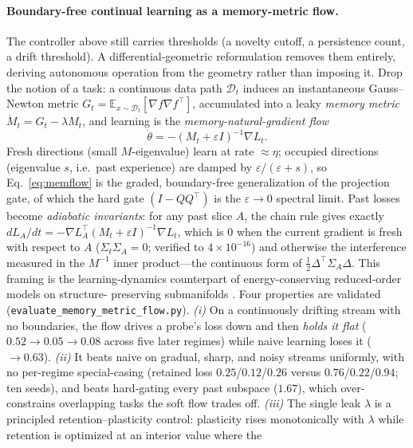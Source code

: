 \documentclass[10pt,a4paper]{article}
\theoremstyle{plain}
\theoremstyle{definition}
\newcommand{\Sig}{\Sigma}
\newcommand{\Del}{\Delta}
\begin{document}
\paragraph{Boundary-free continual learning as a memory-metric flow.} The controller
above still carries thresholds (a novelty cutoff, a persistence count, a drift
threshold). A differential-geometric reformulation removes them entirely, deriving
autonomous operation from the geometry rather than imposing it. Drop the notion of a task:
a continuous data path $\mathcal D_t$ induces an instantaneous Gauss--Newton metric
$G_t=\mathbb{E}_{x\sim\mathcal D_t}[\nabla f\nabla f^\top]$, accumulated into a leaky
\emph{memory metric} $\dot M_t=G_t-\lambda M_t$, and learning is the
\emph{memory-natural-gradient flow}
\begin{equation}
\dot\theta=-(M_t+\varepsilon I)^{-1}\nabla L_t.
\label{eq:memflow}
\end{equation}
Fresh directions (small $M$-eigenvalue) learn at rate $\approx\!\eta$; occupied
directions (eigenvalue $s$, i.e.\ past experience) are damped by $\varepsilon/(\varepsilon+s)$,
so Eq.~\eqref{eq:memflow} is the graded, boundary-free generalization of the projection
gate, of which the hard gate $(I-QQ^\top)$ is the $\varepsilon\!\to\!0$ spectral limit. Past
losses become \emph{adiabatic invariants}: for any past slice $A$, the chain rule gives
exactly $dL_A/dt=-\nabla L_A^\top(M_t+\varepsilon I)^{-1}\nabla L_t$, which is $0$ when the
current gradient is fresh with respect to $A$ ($\Sig_t\Sig_A=0$; verified to $4\times
10^{-16}$) and otherwise the interference measured in the $M^{-1}$ inner
product---the continuous form of $\tfrac12\Del^\top\Sig_A\Del$. This framing is the
learning-dynamics counterpart of energy-conserving reduced-order models on structure-
preserving submanifolds \cite{friedl2026hamiltonian}. Four properties are validated
(\texttt{evaluate\_memory\_metric\_flow.py}). \emph{(i)} On a continuously drifting stream
with no boundaries, the flow drives a probe's loss down and then \emph{holds it flat}
($0.52\!\to\!0.05\!\to\!0.08$ across five later regimes) while naive learning loses it
($\to0.63$). \emph{(ii)} It beats naive on gradual, sharp, and noisy streams uniformly,
with no per-regime special-casing (retained loss $0.25$/$0.12$/$0.26$ versus
$0.76$/$0.22$/$0.94$; ten seeds), and beats hard-gating every past subspace ($1.67$),
which over-constrains overlapping tasks the soft flow trades off. \emph{(iii)} The single
leak $\lambda$ is a principled retention--plasticity control: plasticity rises
monotonically with $\lambda$ while retention is optimized at an interior value where the
\end{document}
